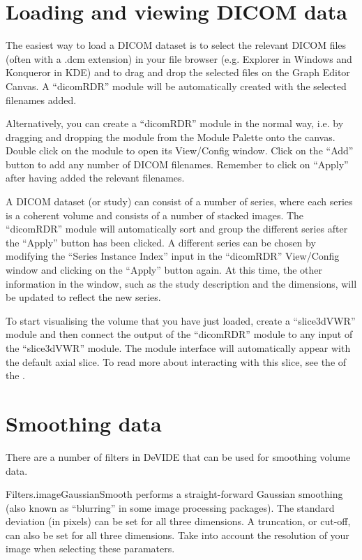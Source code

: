 \section{Loading and viewing DICOM data}
The easiest way to load a DICOM dataset is to select the relevant
DICOM files (often with a .dcm extension) in your file browser
(e.g. Explorer in Windows and Konqueror in KDE) and to drag and drop
the selected files on the Graph Editor Canvas.  A ``dicomRDR'' module
will be automatically created with the selected filenames added.

Alternatively, you can create a ``dicomRDR'' module in the normal way,
i.e. by dragging and dropping the module from the Module Palette onto
the canvas.  Double click on the module to open its View/Config
window.  Click on the ``Add'' button to add any number of DICOM
filenames.  Remember to click on ``Apply'' after having added the
relevant filenames.

A DICOM dataset (or study) can consist of a number of series, where
each series is a coherent volume and consists of a number of stacked
images.  The ``dicomRDR'' module will automatically sort and group the
different series after the ``Apply'' button has been clicked.  A
different series can be chosen by modifying the ``Series Instance
Index'' input in the ``dicomRDR'' View/Config window and clicking on
the ``Apply'' button again.  At this time, the other information in
the window, such as the study description and the dimensions, will be
updated to reflect the new series.

To start visualising the volume that you have just loaded, create a
``slice3dVWR'' module and then connect the output of the ``dicomRDR''
module to any input of the ``slice3dVWR'' module.  The module
interface will automatically appear with the default axial slice.  To
read more about interacting with this slice, see the  of the .

\section{Smoothing data}
There are a number of filters in DeVIDE that can be used for smoothing
volume data.

Filters.imageGaussianSmooth performs a straight-forward Gaussian
smoothing (also known as ``blurring'' in some image processing
packages).  The standard deviation (in pixels) can be set for all
three dimensions.  A truncation, or cut-off, can also be set for all
three dimensions.  Take into account the resolution of your image when
selecting these paramaters.

